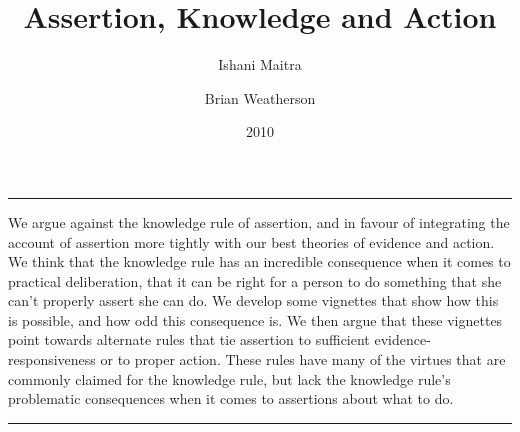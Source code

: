 \documentclass[
  10pt,
  letterpaper,
  DIV=11,
  numbers=noendperiod,
  twoside]{scrartcl}
\title{Assertion, Knowledge and Action}
\author{Ishani Maitra \and Brian Weatherson}
\date{2010}
\renewenvironment{abstract}
 {\vspace{-1.25cm}
 \quotation\small\noindent\rule{\linewidth}{.5pt}\par\smallskip
 \noindent }
 {\par\noindent\rule{\linewidth}{.5pt}\endquotation}
\begin{document}
\maketitle
\begin{abstract}
We argue against the knowledge rule of assertion, and in favour of
integrating the account of assertion more tightly with our best theories
of evidence and action. We think that the knowledge rule has an
incredible consequence when it comes to practical deliberation, that it
can be right for a person to do something that she can't properly assert
she can do. We develop some vignettes that show how this is possible,
and how odd this consequence is. We then argue that these vignettes
point towards alternate rules that tie assertion to sufficient
evidence-responsiveness or to proper action. These rules have many of
the virtues that are commonly claimed for the knowledge rule, but lack
the knowledge rule's problematic consequences when it comes to
assertions about what to do.
\end{abstract}
\end{document}
